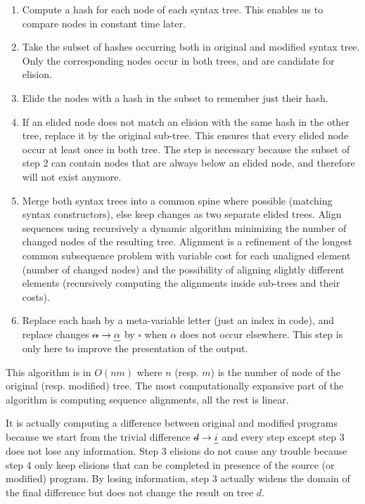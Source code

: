 \documentclass[a4paper,11pt]{article}
\newcommand\mathst[1]{\text{\st{$#1$}}}
\newcommand\mathul[1]{\text{\ul{$#1$}}}
\newcommand\id{\square}
\newcommand\change[2]{\mathst{#1} \rightarrow \mathul{#2}}
\begin{document}
\begin{enumerate}
  \item Compute a hash for each node of each syntax tree. This enables us to compare nodes in constant time later.

  \item Take the subset of hashes occurring both in original and
    modified syntax tree. Only the corresponding nodes occur in both trees, and are candidate for elision.

  \item Elide the nodes with a hash in the subset to remember just
    their hash.

  \item If an elided node does not match an elision with the same hash
    in the other tree, replace it by the original sub-tree. This ensures that every elided node occur at least once in both tree. The step is necessary because the subset of step 2 can contain nodes that are always below an elided node, and therefore will not exist anymore.

  \item Merge both syntax trees into a common spine where possible (matching syntax constructors), else keep changes as two separate elided trees.
  Align sequences using recursively a dynamic algorithm minimizing the number of changed nodes of the resulting tree.
  Alignment is a refinement of the longest common subsequence problem  with variable cost for each unaligned element (number of changed nodes) and the possibility of aligning slightly different elements (recursively computing the alignments inside sub-trees and their costs).

  \item Replace each hash by a meta-variable letter (just an index in
    code), and replace changes $\change{\alpha}{\alpha}$ by $\id$ when $\alpha$ does not occur elsewhere. This step is only here to improve the presentation of the output.
\end{enumerate}

This algorithm is in $O(nm)$ where $n$ (resp. $m$) is the number of
node of the original (resp. modified) tree. The most computationally
expansive part of the algorithm is computing sequence alignments, all the rest is linear.

It is actually computing a difference between original and modified programs because we start from the trivial difference $\change{d}{i}$ and every step except step 3 does not lose any information. Step 3 elisions do not cause any trouble because step 4 only keep elisions that can be completed in presence of the source (or modified) program. By losing information, step 3 actually widens the domain of the final difference but does not change the result on tree $d$.
\end{document}
